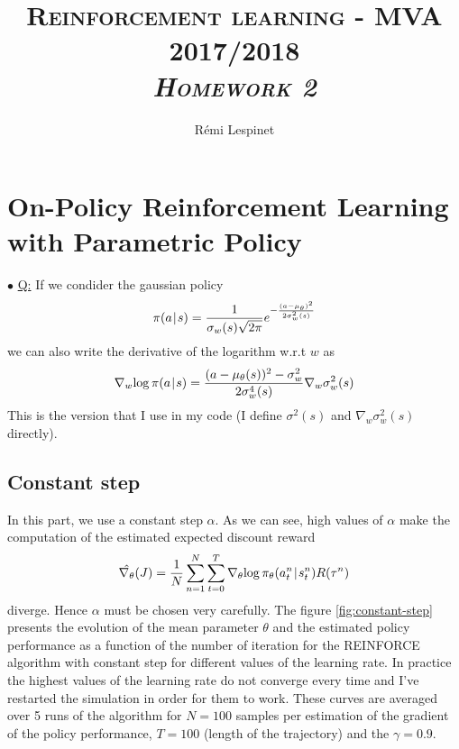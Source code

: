 \documentclass[a4paper, 11pt]{article}
\title{\textsc{Reinforcement learning - MVA 2017/2018 \\ \emph{Homework 2}} }
\author{Rémi Lespinet}
\date{}
\newcounter{cquestion}
\renewcommand{\thecquestion}{\arabic{cquestion}}
\newenvironment{question}
{\par \vspace{0.5em} \noindent \stepcounter{cquestion} \hspace{-1em}
 $\bullet$ \underline{Q\thecquestion :}}
{}
\newcommand{\picond}[2]{\pi(#1 \hspace{-.2em}\mid\hspace{-.2em} #2)}
\newcommand{\parampicond}[3]{\pi_{#1}(#2 \hspace{-.2em}\mid\hspace{-.2em} #3)}
\newcommand{\gradwrt}[2]{\nabla_{#1}{#2}}
\begin{document}
\maketitle
\thispagestyle{fancy}

\section{On-Policy Reinforcement Learning with Parametric Policy}

\begin{question}
  If we condider the gaussian policy
  \begin{displaymath}
    \picond{a}{s} = \dfrac{1}{\sigma_w(s) \sqrt{2 \pi}} e^{-\frac{(a - \mu_{\theta})^2}{2 \sigma_w^2(s)}}
  \end{displaymath}
  we can also write the derivative of the logarithm w.r.t $w$ as
  \begin{displaymath}
    \gradwrt{w}{\log{\picond{a}{s}}} = \dfrac{(a - \mu_{\theta}(s))^2 - \sigma_{w}^2 }{2 \sigma_w^4(s)} \gradwrt{w}{\sigma_{w}^2}(s)
  \end{displaymath}
  This is the version that I use in my code (I define $\sigma^2(s)$
  and $\gradwrt{w}{\sigma_{w}^2}(s)$ directly).

  \subsection{Constant step}

  In this part, we use a constant step $\alpha$. As we can see,
  high values of $\alpha$ make the computation of the estimated
  expected discount reward
  \begin{displaymath}
     \hat{\nabla_{\theta}}(J) = \dfrac{1}{N} \sum_{n = 1}^N \sum_{t = 0}^T \gradwrt{\theta}{\log{\parampicond{\theta}{a_t^{n}}{s_t^{n}}}} R(\tau^n)
  \end{displaymath}
  diverge. Hence $\alpha$ must be chosen very carefully.  The figure
  \ref{fig:constant-step} presents the evolution of the mean parameter
  $\theta$ and the estimated policy performance as a function of the
  number of iteration for the REINFORCE algorithm with constant step
  for different values of the learning rate. In practice the highest
  values of the learning rate do not converge every time and I've
  restarted the simulation in order for them to work. These curves are
  averaged over 5 runs of the algorithm for $N = 100$ samples per
  estimation of the gradient of the policy performance, $T = 100$
  (length of the trajectory) and the $\gamma = 0.9$.


\end{question}
\end{document}

